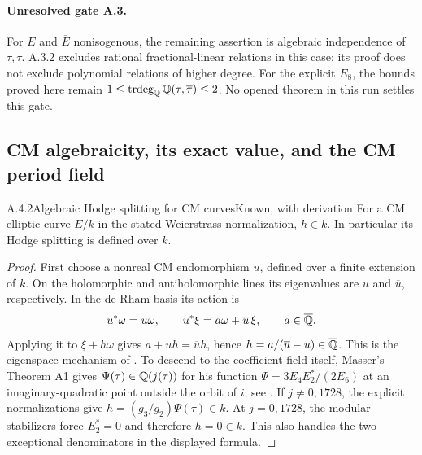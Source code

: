 \paragraph{Unresolved gate A.3.}
For $E$ and $\overline E$ nonisogenous, the remaining assertion is algebraic independence of $\tau,\overline\tau$. A.3.2 excludes rational fractional-linear relations in this case; its proof does not exclude polynomial relations of higher degree. For the explicit $E_8$, the bounds proved here remain
$1\le\operatorname{trdeg}_{\mathbb Q}\mathbb Q(\tau,\overline\tau)\le2$. No opened theorem in this run settles this gate.

\subsection{CM algebraicity, its exact value, and the CM period field}

\begin{result}{A.4.2}{Algebraic Hodge splitting for CM curves}{Known, with derivation}
For a CM elliptic curve $E/k$ in the stated Weierstrass normalization, $h\in k$. In particular its Hodge splitting is defined over $k$.
\end{result}
\begin{proof}
First choose a nonreal CM endomorphism $u$, defined over a finite extension of $k$. On the holomorphic and antiholomorphic lines its eigenvalues are $u$ and $\overline u$, respectively. In the de Rham basis its action is
\[
 u^*\omega=u\omega,\qquad u^*\xi=a\omega+\overline u\,\xi,
 \qquad a\in\overline{\mathbb Q}.
\]
Applying it to $\xi+h\omega$ gives $a+uh=\overline u h$, hence $h=a/(\overline u-u)\in\overline{\mathbb Q}$. This is the eigenspace mechanism of \cite[Lemma 4.0.7, p.501]{EllKatz1976}. To descend to the coefficient field itself, Masser's Theorem A1 gives $\Psi(\tau)\in\mathbb Q(j(\tau))$ for his function
$\Psi=3E_4E_2^*/(2E_6)$ at an imaginary-quadratic point outside the orbit of $i$; see \cite[Appendix One, Theorem A1 and (100), p.114]{EllMasser1975}. If $j\ne0,1728$, the explicit normalizations give $h=(g_3/g_2)\Psi(\tau)\in k$. At $j=0,1728$, the modular stabilizers force $E_2^*=0$ and therefore $h=0\in k$. This also handles the two exceptional denominators in the displayed formula.
\end{proof}

